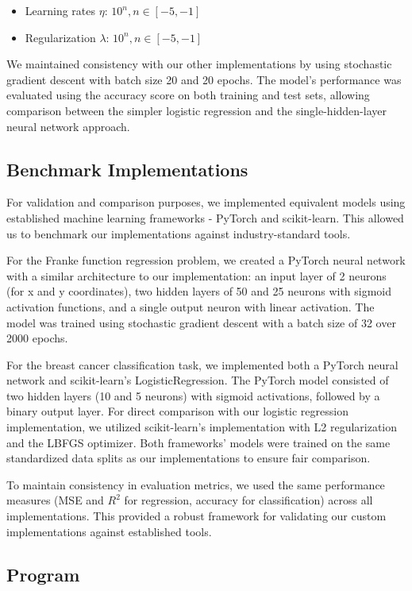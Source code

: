 \begin{itemize}
    \item Learning rates \( \eta \): \( 10^{n}, n \in [-5, -1] \)
    \item Regularization \( \lambda \): \( 10^{n}, n \in [-5, -1] \)
\end{itemize}
We maintained consistency with our other implementations by using stochastic gradient descent with batch size 20 and 20 epochs. The model's performance was evaluated using the accuracy score on both training and test sets, allowing comparison between the simpler logistic regression and the single-hidden-layer neural network approach.

\subsection{Benchmark Implementations}
For validation and comparison purposes, we implemented equivalent models using established machine learning frameworks - PyTorch\cite{PyTorch} and scikit-learn\cite{scikit-learn}. This allowed us to benchmark our implementations against industry-standard tools.

For the Franke function regression problem, we created a PyTorch neural network with a similar architecture to our implementation: an input layer of 2 neurons (for x and y coordinates), two hidden layers of 50 and 25 neurons with sigmoid activation functions, and a single output neuron with linear activation. The model was trained using stochastic gradient descent with a batch size of 32 over 2000 epochs.

For the breast cancer classification task, we implemented both a PyTorch neural network and scikit-learn's LogisticRegression. The PyTorch model consisted of two hidden layers (10 and 5 neurons) with sigmoid activations, followed by a binary output layer. For direct comparison with our logistic regression implementation, we utilized scikit-learn's implementation with L2 regularization and the LBFGS optimizer. Both frameworks' models were trained on the same standardized data splits as our implementations to ensure fair comparison.

To maintain consistency in evaluation metrics, we used the same performance measures (MSE and $R^2$ for regression, accuracy for classification) across all implementations. This provided a robust framework for validating our custom implementations against established tools.

\subsection{Program}\label{sec:program}
